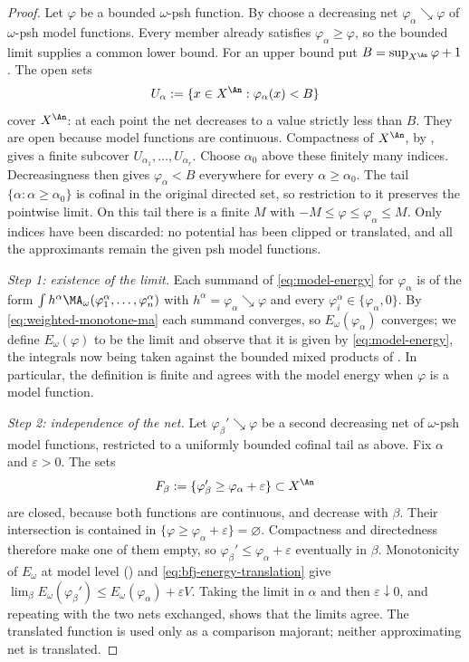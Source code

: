 \begin{proof}
Let \(\varphi\) be a bounded \(\omega\)-psh function.  By
 choose a decreasing net
\(\varphi_\alpha\searrow\varphi\) of \(\omega\)-psh model functions.
Every member already satisfies \(\varphi_\alpha\geq\varphi\), so the
bounded limit supplies a common lower bound.  For an upper bound put
\(B=\sup_{X^{\An}}\varphi+1\).  The open sets
\[
 U_\alpha:=\{x\in X^{\An}:\varphi_\alpha(x)<B\}
\]
cover \(X^{\An}\): at each point the net decreases to a value strictly
less than \(B\).  They are open because model functions are continuous.
Compactness of \(X^{\An}\), by , gives a
finite subcover \(U_{\alpha_1},\ldots,U_{\alpha_r}\).  Choose
\(\alpha_0\) above these finitely many indices.  Decreasingness then gives
\(\varphi_\alpha<B\) everywhere for every \(\alpha\geq\alpha_0\).
The tail \(\{\alpha:\alpha\geq\alpha_0\}\) is cofinal in the original
directed set, so restriction to it preserves the pointwise limit.  On
this tail there is a finite \(M\) with
\(-M\leq\varphi\leq\varphi_\alpha\leq M\).
Only indices have been discarded: no potential has been clipped or
translated, and all the approximants remain the given psh model functions.

\emph{Step 1: existence of the limit.}  Each summand of
\eqref{eq:model-energy} for \(\varphi_\alpha\) is of the form
\(\int h^\alpha\MA_\omega(\varphi_1^\alpha,\ldots,\varphi_n^\alpha)\) with
\(h^\alpha=\varphi_\alpha\searrow\varphi\) and every
\(\varphi_i^\alpha\in\{\varphi_\alpha,0\}\).  By
\eqref{eq:weighted-monotone-ma} each summand converges, so
\(E_\omega(\varphi_\alpha)\) converges; we define \(E_\omega(\varphi)\) to be
the limit and observe that it is given by \eqref{eq:model-energy}, the
integrals now being taken against the bounded mixed products of
.  In particular, the definition is finite
and agrees with the model energy when \(\varphi\) is a model function.

\emph{Step 2: independence of the net.}  Let \(\varphi_\beta'\searrow\varphi\)
be a second decreasing net of \(\omega\)-psh model functions, restricted
to a uniformly bounded cofinal tail as above.  Fix
\(\alpha\) and \(\varepsilon>0\).  The sets
\[
 F_\beta:=\{\varphi_\beta'\geq\varphi_\alpha+\varepsilon\}\subset X^{\An}
\]
are closed, because both functions are continuous, and decrease with
\(\beta\).  Their intersection is contained in
\(\{\varphi\geq\varphi_\alpha+\varepsilon\}=\varnothing\).
Compactness and directedness therefore make one of them empty, so
\(\varphi_\beta'\leq\varphi_\alpha+\varepsilon\) eventually in \(\beta\).
Monotonicity of \(E_\omega\) at model level
() and
\eqref{eq:bfj-energy-translation} give
\(\lim_\beta E_\omega(\varphi_\beta')\leq
E_\omega(\varphi_\alpha)+\varepsilon V\).  Taking the limit in \(\alpha\)
and then \(\varepsilon\downarrow0\), and repeating with the two nets
exchanged, shows that the limits agree.  The translated function is used
only as a comparison majorant; neither approximating net is translated.


\end{proof}

